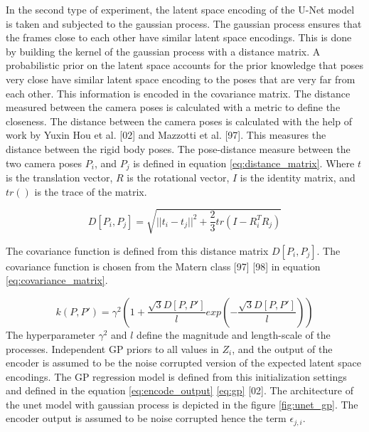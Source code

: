     In the second type of experiment, the latent space encoding of the U-Net model is taken and subjected to the gaussian process. The gaussian process ensures that the frames close to each other have similar latent space encodings. This is done by building the kernel of the gaussian process with a distance matrix. A probabilistic prior on the latent space accounts for the prior knowledge that poses very close have similar latent space encoding to the poses that are very far from each other. This information is encoded in the covariance matrix. The distance measured between the camera poses is calculated with a metric to define the closeness. The distance between the camera poses is calculated with the help of work by Yuxin Hou et al. [02] and Mazzotti et al. [97]. This measures the distance between the rigid body poses. The pose-distance measure between the two camera poses $P_i$, and $P_j$ is defined in equation \ref{eq:distance_matrix}. Where $t$ is the translation vector, $R$ is the rotational vector, $I$ is the identity matrix, and $tr()$ is the trace of the matrix.  
    
    \begin{equation}
     D[P_i, P_j] = \sqrt{{||t_i - t_j||}^2 + \frac{2}{3} tr(I - R_i^TR_j)}
     \label{eq:distance_matrix}    
    \end{equation}
	
	The covariance function is defined from this distance matrix $D[P_i, P_j]$. The covariance function is chosen from the Matern class [97] [98] in equation \ref{eq:covariance_matrix}.  
	
	\begin{equation}
		k(P,P') = \gamma^2(1+\frac{\sqrt{3}D[P,P']}{l}exp(-\frac{\sqrt{3}D[P,P']}{l}))
		\label{eq:covariance_matrix}
	\end{equation}
	The hyperparameter $\gamma^2$ and $l$ define the magnitude and length-scale of the processes. Independent GP priors to all values in $Z_i$, and the output of the encoder is assumed to be the noise corrupted version of the expected latent space encodings. The GP regression model is defined from this initialization settings and defined in the equation \ref{eq:encode_output} \ref{eq:gp} [02]. The architecture of the unet model with gaussian process is depicted in the figure \ref{fig:unet_gp}. The encoder output is assumed to be noise corrupted hence the term $\epsilon_{j,i}$. 

